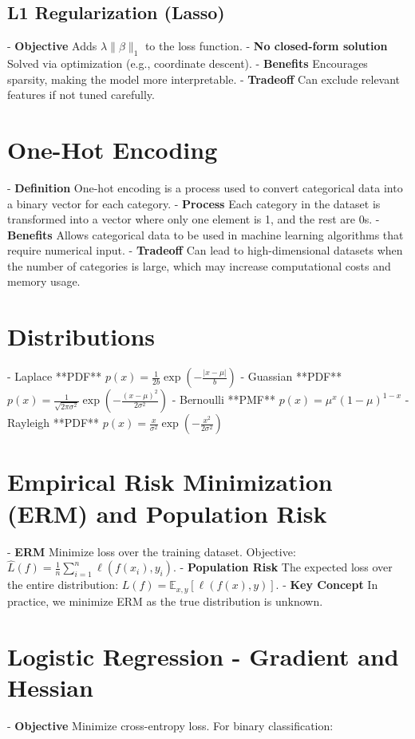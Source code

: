 \documentclass[10pt]{article}
\begin{document}
\begin{multicols}{2}
\subsection*{L1 Regularization (Lasso)}
- \textbf{Objective} Adds $\lambda \|\beta\|_1$ to the loss function.
- \textbf{No closed-form solution} Solved via optimization (e.g., coordinate descent).
- \textbf{Benefits} Encourages sparsity, making the model more interpretable.
- \textbf{Tradeoff} Can exclude relevant features if not tuned carefully.

\section*{One-Hot Encoding}
- \textbf{Definition} One-hot encoding is a process used to convert categorical data into a binary vector for each category.
- \textbf{Process} Each category in the dataset is transformed into a vector where only one element is 1, and the rest are 0s.
- \textbf{Benefits} Allows categorical data to be used in machine learning algorithms that require numerical input.
- \textbf{Tradeoff} Can lead to high-dimensional datasets when the number of categories is large, which may increase computational costs and memory usage.

\section*{Distributions}

- Laplace **PDF** $p(x) = \frac{1}{2b} \exp\left(-\frac{|x-\mu|}{b}\right)$
- Guassian **PDF** $p(x) = \frac{1}{\sqrt{2\pi\sigma^2}} \exp\left(-\frac{(x-\mu)^2}{2\sigma^2}\right)$
- Bernoulli **PMF** $p(x) = \mu^x(1-\mu)^{1-x}$
- Rayleigh **PDF** $p(x) = \frac{x}{\sigma^2} \exp\left(-\frac{x^2}{2\sigma^2}\right)$




\section*{Empirical Risk Minimization (ERM) and Population Risk}
- \textbf{ERM} Minimize loss over the training dataset. Objective: $\hat{L}(f) = \frac{1}{n} \sum_{i=1}^{n} \ell(f(x_i), y_i)$.
- \textbf{Population Risk} The expected loss over the entire distribution: $L(f) = \mathbb{E}_{x,y}[\ell(f(x), y)]$.
- \textbf{Key Concept} In practice, we minimize ERM as the true distribution is unknown.

\section*{Logistic Regression - Gradient and Hessian}
- \textbf{Objective} Minimize cross-entropy loss. For binary classification:
  

\end{multicols}
\end{document}
